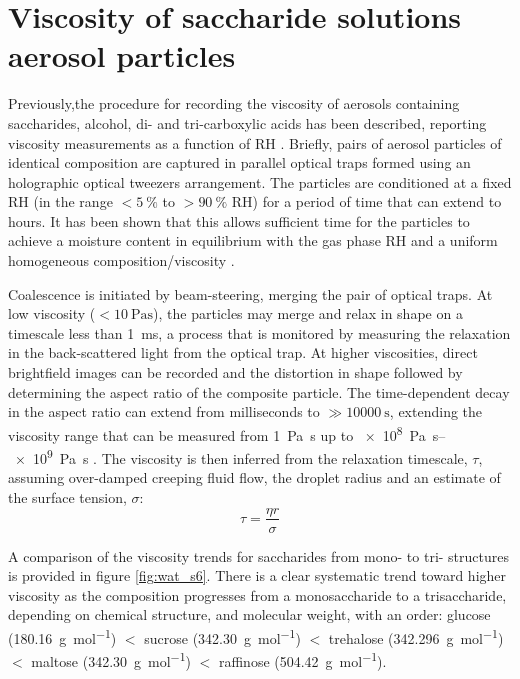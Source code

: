 \section{Viscosity of saccharide solutions aerosol particles}

Previously,the procedure for recording the viscosity of aerosols containing saccharides, alcohol, di- and tri-carboxylic acids  has been described, reporting viscosity measurements as a function of RH \cite{powerProbingMicrorheologicalProperties2014,Song2016a,powerTransitionLiquidSolidlike2013}. Briefly, pairs of aerosol particles of identical composition are captured in parallel optical traps formed using an holographic optical tweezers arrangement. The particles are conditioned at a fixed RH (in the range $<\SI{5}{\percent}$ to $>\SI{90}{\percent}$ RH) for a period of time that can extend to hours. It has been shown that this allows sufficient time for the particles to achieve a moisture content in equilibrium with the gas phase RH and a uniform homogeneous composition/viscosity \cite{Song2016a}. 

Coalescence is initiated by beam-steering, merging the pair of optical traps. At low viscosity ($<\SI{10}{\pascal\second}$), the particles may merge and relax in shape on a timescale less than \SI{1}{\milli\second}, a process that is monitored by measuring the relaxation in the back-scattered light from the optical trap. At higher viscosities, direct brightfield images can be recorded and the distortion in shape followed by determining the aspect ratio of the composite particle. The time-dependent decay in the aspect ratio can extend from milliseconds to $\gg \SI{10000}{\second}$, extending the viscosity range that can be measured from \SI{1}{\pascal\second}  up to \SIrange[range-phrase=\text{--}]{e8}{e9}{\pascal\second} \cite{Song2016a}. The viscosity is then inferred from the relaxation timescale, $\tau$, assuming over-damped creeping fluid flow, the droplet radius and an estimate of the surface tension, $\sigma$:
\begin{equation}
\tau=\frac{\eta r}{\sigma}
\end{equation}

A comparison of the viscosity trends for saccharides from mono- to tri- structures is provided in figure \ref{fig:wat_s6}. There is a clear systematic trend toward higher viscosity as the composition progresses from a monosaccharide to a trisaccharide, depending on chemical structure, and molecular weight, with an order: glucose (\SI{180.16}{\gram\per\mole}) $<$ sucrose (\SI{342.30}{\gram\per\mol}) $<$ trehalose (\SI{342.296}{\gram\per\mol}) $<$ maltose (\SI{342.30}{\gram\per\mol}) $<$ raffinose (\SI{504.42}{\gram\per\mol}).


